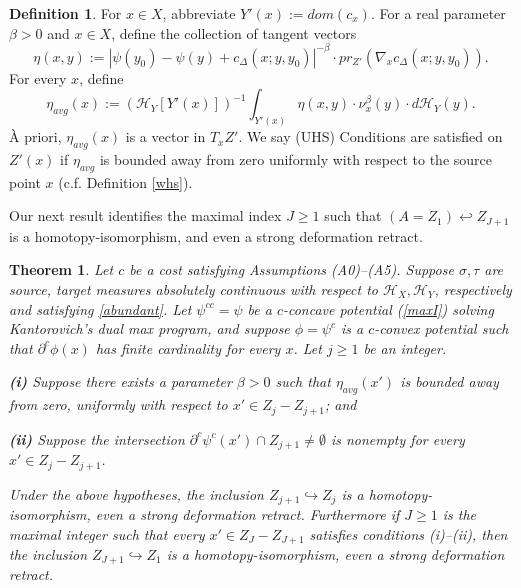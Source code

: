 \documentclass[12pt]{amsart}
\newtheorem{thm}{Theorem}
\theoremstyle{definition}
\newtheorem{dfn}{Definition}
\theoremstyle{remark}
\newcommand{\bR}{\mathbb{R}}
\newcommand{\del}{\partial}
\newcommand{\sub}{\del^c \psi^c(x')}
\newcommand{\hh}{\hookleftarrow}
\newcommand{\cd}{c_\Delta}
\begin{document}
\begin{dfn}
For $x\in X$, abbreviate $Y'(x):=dom(c_x)$. For a real parameter $\beta>0$ and $x\in X$, define the collection of tangent vectors $$ \eta(x, y):=|\psi(y_0)-\psi(y)+\cd(x; y, y_0)|^{-\beta} \cdot pr_{Z'}( \nabla_x \cd(x; y, y_0)). $$ For every $x$, define 
\begin{equation}
\eta_{avg}(x):=(\mathscr{H}_Y[Y'(x)])^{-1} \int_{Y'(x)} \eta(x,y) \cdot \nu^\beta_x (y) \cdot d\mathscr{H}_Y(y). 
\label{avg2}\end{equation} \`A priori, $\eta_{avg}(x)$ is a vector in $T_x Z'$. We say (UHS) Conditions are satisfied on $Z'(x)$ if $\eta_{avg}$ is bounded away from zero uniformly with respect to the source point $x$ (c.f. Definition \ref{whs}).
\end{dfn}



Our next result identifies the maximal index $J\geq 1$ such that $(A=Z_1) \hh Z_{J+1}$ is a homotopy-isomorphism, and even a strong deformation retract. 
\begin{thm}\label{B} 
Let $c$ be a cost satisfying Assumptions (A0)--(A5). Suppose $\sigma, \tau$ are source, target measures absolutely continuous with respect to $\mathscr{H}_X, \mathscr{H}_Y$, respectively and satisfying \eqref{abundant}. Let $\psi^{cc}=\psi$ be a $c$-concave potential (\ref{maxI}) solving Kantorovich's dual max program, and suppose $\phi=\psi^c$ is a $c$-convex potential such that $\del^c \phi(x)$ has finite cardinality for every $x$. Let $j\geq 1$ be an integer. 

\textbf{(i)} Suppose there exists a parameter $\beta>0$ such that $\eta_{avg}(x')$  is bounded away from zero, uniformly with respect to $x' \in Z_j-Z_{j+1}$; and 

\textbf{(ii)} Suppose the intersection $\sub \cap Z_{j+1} \neq \emptyset$ is nonempty for every $x'\in Z_j-Z_{j+1}$. 

Under the above hypotheses, the inclusion $Z_{j+1} \hookrightarrow Z_j$ is a homotopy-isomorphism, even a strong deformation retract. Furthermore if $J\geq 1$ is the maximal integer such that every $x'\in Z_J-Z_{J+1}$ satisfies conditions (i)--(ii), then the inclusion $Z_{J+1} \hookrightarrow Z_1$ is a homotopy-isomorphism, even a strong deformation retract.
\end{thm}
\end{document}
